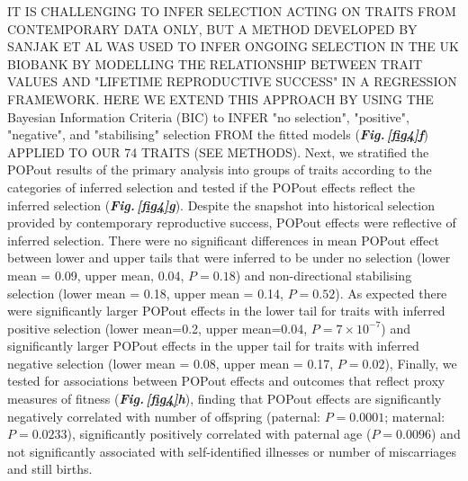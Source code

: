 \documentclass[12pt]{zHenriquesLab-StyleBioRxiv}
\newcommand\dref[2]{\normalsize{\textbf{\textit{Fig.\,\ref{#1}#2}}}\normalsize{}}
\begin{document}
{{IT IS CHALLENGING TO INFER SELECTION ACTING ON TRAITS FROM 
CONTEMPORARY DATA ONLY, BUT A METHOD DEVELOPED BY SANJAK ET AL WAS USED  
TO INFER ONGOING SELECTION IN THE UK BIOBANK BY MODELLING THE RELATIONSHIP 
BETWEEN TRAIT VALUES AND "LIFETIME REPRODUCTIVE SUCCESS" IN A REGRESSION FRAMEWORK. HERE 
WE EXTEND THIS APPROACH BY USING THE Bayesian Information Criteria (BIC) 
to INFER "no selection", "positive", "negative", and 
"stabilising" selection FROM the fitted models (\dref{fig4}{f}) APPLIED TO OUR 74 TRAITS (SEE METHODS). 
Next, we stratified the POPout results of the primary analysis into 
groups of traits according to the categories of inferred selection and tested if 
the POPout effects reflect the inferred selection (\dref{fig4}{g}). 
Despite the snapshot into historical selection provided by 
contemporary reproductive success, POPout effects were reflective 
of inferred selection. There were no significant differences in 
mean POPout effect between lower and upper tails that were inferred to 
be under no selection (lower mean = 0.09, upper mean, 0.04, $P=0.18$) 
and non-directional stabilising selection (lower mean = 0.18, upper mean = 0.14, $P=0.52$). 
As expected there were significantly larger POPout effects in the lower tail 
for traits with inferred positive selection (lower mean=0.2, upper mean=0.04, $P=7 \times 10^{-7}$) 
and significantly larger POPout effects in the upper 
tail for traits with inferred negative selection (lower mean = 0.08, upper mean = 0.17, $P=0.02$), 
Finally, we tested for associations between POPout effects and outcomes that reflect proxy 
measures of fitness (\dref{fig4}{h}), finding that POPout effects are significantly negatively correlated with number of 
offspring (paternal: $P=0.0001$; maternal: $P=0.0233$), significantly positively correlated 
with paternal age ($P=0.0096$) and not significantly associated with self-identified illnesses 
or number of miscarriages and still births. 
% 
% 
% 
% 
% 
% 
% 
% 
% 
% 
% 
% 
% 
% 
% 
% 
% 
% 
% 
% 
% 
% 
% 
% 
% 
% 
% 
% 
% 
% 
% 
% 
% 
% 
% 
% 
% 
% 
% 
% 
% 
% 
% 
% 
% 
% 
% 
% 
% 
% 
\FloatBarrier
}}
\end{document}
